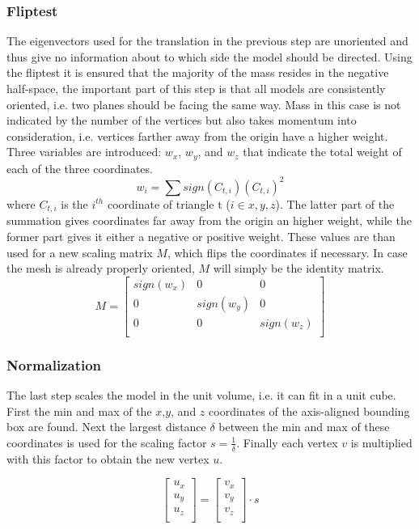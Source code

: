 \documentclass{bigdata}
\begin{document}
\subsubsection{Fliptest}
The eigenvectors used for the translation in the previous step are unoriented and thus give no information about to which side the model should be directed. Using the fliptest it is ensured that the majority of the mass resides in the negative half-space, the important part of this step is that all models are consistently oriented, i.e. two planes should be facing the same way. Mass in this case is not indicated by the number of the vertices but also takes momentum into consideration, i.e. vertices farther away from the origin have a higher weight. Three variables are introduced: $w_x$, $w_y$, and $w_z$ that indicate the total weight of each of the three coordinates. 
\begin{equation}
w_i = \sum sign(C_{t,i})(C_{t,i})^2
\end{equation}
 where $C_{t,i}$ is the $i^{th}$ coordinate of triangle t ($i \in {x,y,z}$). The latter part of the summation gives coordinates far away from the origin an higher weight, while the former part gives it either a negative or positive weight. These values are than used for a new scaling matrix $M$, which flips the coordinates if necessary. In case the mesh is already properly oriented, $M$ will simply be the identity matrix.
\[
M = 
\begin{bmatrix}
sign(w_x) & 0 & 0 \\
0 & sign(w_y) & 0 \\
0 & 0 & sign(w_z) \\
\end{bmatrix}
\]

\subsubsection{Normalization}

The last step scales the model in the unit volume, i.e. it can fit in a unit cube. First the min and max of the $x$,$y$, and $z$ coordinates of the axis-aligned bounding box are found. Next the largest distance $\delta$ between the min and max of these coordinates is used for the scaling factor $s = \frac{1}{\delta}$. Finally each vertex $v$ is multiplied with this factor to obtain the new vertex $u$.

\[
\begin{bmatrix}
u_x \\
u_y \\
u_z \\
\end{bmatrix}
=
\begin{bmatrix}
v_x \\
v_y \\
v_z \\
\end{bmatrix}
\cdot s
\]
\end{document}
